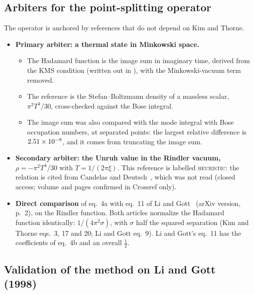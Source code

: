 \subsection{Arbiters for the point-splitting operator}
\label{sec:arbiters}

The operator is anchored by references that do not depend on Kim and Thorne.
\begin{itemize}
\item \textbf{Primary arbiter: a thermal state in Minkowski space.}
  \begin{itemize}
  \item The Hadamard function is the image sum in imaginary time, derived from the KMS condition (written out in ), with the Minkowski-vacuum term removed.
  \item The reference is the Stefan--Boltzmann density of a massless scalar, $\pi^2T^4/30$, cross-checked against the Bose integral.
  \item The image sum was also compared with the mode integral with Bose occupation numbers, at separated points: the largest relative difference is $2.51\times10^{-8}$, and it comes from truncating the image sum.
  \end{itemize}
\item \textbf{Secondary arbiter: the Unruh value in the Rindler vacuum,} $\rho = -\pi^2T^4/30$ with $T = 1/(2\pi\xi)$. This reference is labelled \textsc{heuristic}: the relation is cited from Candelas and Deutsch~\cite{candelas1977}, which was not read (closed access; volume and pages confirmed in Crossref only).
\item \textbf{Direct comparison} of eq.~4a with eq.~11 of Li and Gott~\cite{ligott1998} (arXiv version, p.~2), on the Rindler function. Both articles normalize the Hadamard function identically: $1/(4\pi^2\sigma)$, with $\sigma$ half the squared separation (Kim and Thorne eqs.~3, 17 and 20; Li and Gott eq.~9). Li and Gott's eq.~11 has the coefficients of eq.~4b and an overall $\tfrac12$.
\end{itemize}

\subsection{Validation of the method on Li and Gott (1998)}

